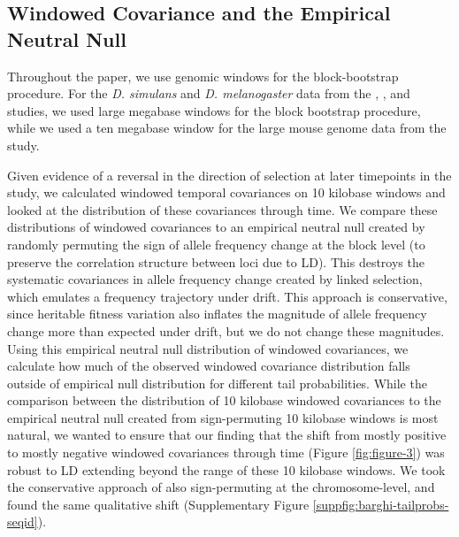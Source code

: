 \documentclass[11pt]{article}
\begin{document}
\subsection{Windowed Covariance and the Empirical Neutral Null}

Throughout the paper, we use genomic windows for the block-bootstrap procedure.
For the \emph{D. simulans} and \emph{D.  melanogaster} data from the
\textcite{Barghi2019-qy}, \textcite{Kelly2019-dc}, and
\textcite{Bergland2014-ij} studies, we used large megabase windows for the
block bootstrap procedure, while we used a ten megabase window for the large
mouse genome data from the \textcite{Castro2019-uk} study. 

Given evidence of a reversal in the direction of selection at later timepoints
in the \textcite{Barghi2019-qy} study, we calculated windowed temporal
covariances on 10 kilobase windows and looked at the distribution of these
covariances through time. We compare these distributions of windowed
covariances to an empirical neutral null created by randomly permuting the sign
of allele frequency change at the block level (to preserve the correlation
structure between loci due to LD). This destroys the systematic covariances in
allele frequency change created by linked selection, which emulates a frequency
trajectory under drift. This approach is conservative, since heritable fitness
variation also inflates the magnitude of allele frequency change more than
expected under drift, but we do not change these magnitudes. Using this
empirical neutral null distribution of windowed covariances, we calculate how
much of the observed windowed covariance distribution falls outside of
empirical null distribution for different tail probabilities. While the
comparison between the distribution of 10 kilobase windowed covariances to the
empirical neutral null created from sign-permuting 10 kilobase windows is most
natural, we wanted to ensure that our finding that the shift from mostly
positive to mostly negative windowed covariances through time (Figure
\ref{fig:figure-3}) was robust to LD extending beyond the range of these 10
kilobase windows. We took the conservative approach of also sign-permuting at
the chromosome-level, and found the same qualitative shift (Supplementary
Figure \ref{suppfig:barghi-tailprobs-seqid}).
\end{document}
